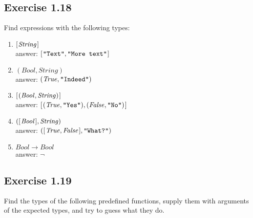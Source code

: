 \documentclass{article}
\newcommand{\Conid}[1]{\mathit{#1}}
\begin{document}
\subsection*{Exercise 1.18}
Find expressions with the following types:
\begin{enumerate}
  \item \ensuremath{[\mskip1.5mu \Conid{String}\mskip1.5mu]}\\
     answer: \ensuremath{[\mskip1.5mu \text{\tt \char34 Text\char34},\text{\tt \char34 More~text\char34}\mskip1.5mu]}

  \item \ensuremath{(\Conid{Bool},\Conid{String})}\\
     answer: \ensuremath{(\Conid{True},\text{\tt \char34 Indeed\char34})}

  \item \ensuremath{[\mskip1.5mu (\Conid{Bool},\Conid{String})\mskip1.5mu]}\\
     answer: \ensuremath{[\mskip1.5mu (\Conid{True},\text{\tt \char34 Yes\char34}),(\Conid{False},\text{\tt \char34 No\char34})\mskip1.5mu]}

  \item \ensuremath{([\mskip1.5mu \Conid{Bool}\mskip1.5mu],\Conid{String})}\\
     answer: \ensuremath{([\mskip1.5mu \Conid{True},\Conid{False}\mskip1.5mu],\text{\tt \char34 What?\char34})}

  \item \ensuremath{\Conid{Bool}\to \Conid{Bool}}\\
     answer: \ensuremath{\neg }
\end{enumerate}

\subsection*{Exercise 1.19}
Find the types of the following predefined functions, supply them with arguments of the expected types, and try to guess what they do.
\end{document}
